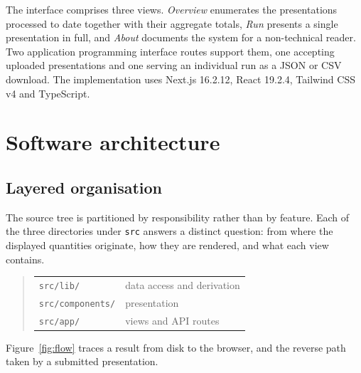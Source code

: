 \documentclass[11pt,a4paper]{article}
\begin{document}
The interface comprises three views. \emph{Overview} enumerates the presentations
processed to date together with their aggregate totals, \emph{Run} presents a
single presentation in full, and \emph{About} documents the system for a non-technical
reader. Two application programming interface routes support them, one accepting
uploaded presentations and one serving an individual run as a JSON or CSV download. The
implementation uses Next.js 16.2.12, React 19.2.4, Tailwind CSS v4 and
TypeScript.

\section{Software architecture}

\subsection{Layered organisation}

The source tree is partitioned by responsibility rather than by feature. Each of
the three directories under \texttt{src} answers a distinct question: from where
the displayed quantities originate, how they are rendered, and what each view
contains.

\begin{quote}
\begin{tabular}{@{}ll@{}}
\texttt{src/lib/}        & data access and derivation \\
\texttt{src/components/} & presentation \\
\texttt{src/app/}        & views and API routes \\
\end{tabular}
\end{quote}

Figure~\ref{fig:flow} traces a result from disk to the browser, and the reverse
path taken by a submitted presentation.
\end{document}
